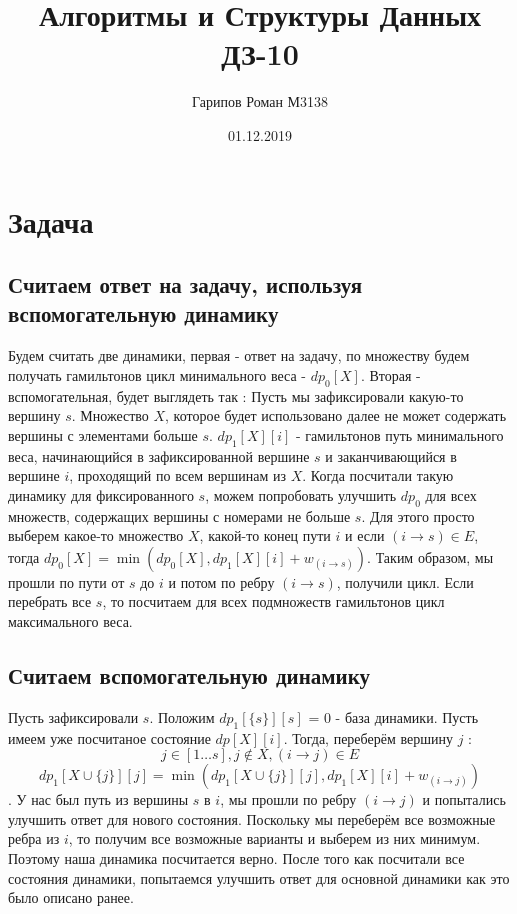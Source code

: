 \documentclass{article}
\title{Алгоритмы и Структуры Данных ДЗ-10}
\date{01.12.2019}
\author{Гарипов Роман М3138}
\begin{document}
  \maketitle
  \newpage

\section*{Задача }
\subsection*{Считаем ответ на задачу, используя вспомогательную динамику}
Будем считать две динамики, первая - ответ на задачу, по множеству будем получать гамильтонов цикл минимального веса - $dp_{0}[X]$. 
\newline
Вторая - вспомогательная, будет выглядеть так :
\newline
Пусть мы зафиксировали какую-то вершину $s$. Множество $X$, которое будет использовано далее не может содержать вершины с элементами больше $s$.
\newline
$dp_{1}[X][i]$ - гамильтонов путь минимального веса, начинающийся в зафиксированной вершине $s$ и заканчивающийся в вершине $i$, проходящий по всем вершинам из $X$.
\newline
Когда посчитали такую динамику для фиксированного $s$, можем попробовать улучшить $dp_{0}$ для всех множеств, содержащих вершины с номерами не больше $s$. Для этого просто выберем какое-то множество $X$, какой-то конец пути $i$ и если $(i \to s) \in E$, тогда $dp_{0}[X] = \min(dp_{0}[X], dp_{1}[X][i] + w_{(i \to s)})$. Таким образом, мы прошли по пути от $s$ до $i$ и потом по ребру $(i \to s)$, получили цикл. 
\newline
Если перебрать все $s$, то посчитаем для всех подмножеств гамильтонов цикл максимального веса.
\subsection*{Считаем вспомогательную динамику}
Пусть зафиксировали $s$. 
\newline
Положим $dp_{1}[\{s\}][s]$ = 0 - база динамики. 
\newline
Пусть имеем уже посчитаное состояние $dp[X][i]$. Тогда, переберём вершину $j$ : $$j \in [1 \dots s], j \notin X, (i \to j) \in E$$ 
$$dp_{1}[X \cup{} \{j\}][j] = \min(dp_{1}[X \cup \{j\}][j], dp_{1}[X][i] + w_{(i \to j)})$$.
\newline
У нас был путь из вершины $s$ в $i$, мы прошли по ребру $(i \to j)$ и попытались улучшить ответ для нового состояния. Поскольку мы переберём все возможные ребра из $i$, то получим все возможные варианты и выберем из них минимум. Поэтому наша динамика посчитается верно.
\newline
После того как посчитали все состояния динамики,  попытаемся улучшить ответ для основной динамики как это было описано ранее.
\end{document}
